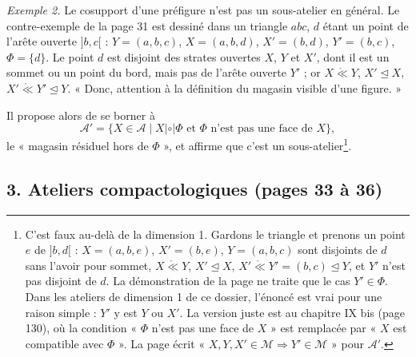\documentclass[11pt,a4paper]{article}
\begin{document}
\emph{Exemple 2.} Le cosupport d'une préfigure n'est pas un sous-atelier en
général. Le contre-exemple de la page 31 est dessiné dans un triangle $abc$,
$d$ étant un point de l'arête ouverte $]b,c[$ : $Y = (a,b,c)$, $X = (a,b,d)$,
$X' = (b,d)$, $Y' = (b,c)$, $\Phi = \{d\}$. Le point $d$ est disjoint des strates
ouvertes $X$, $Y$ et $X'$, dont il est un sommet ou un point du bord, mais pas
de l'arête ouverte $Y'$ ; or $X \mathrel{\mathring{\ll}} Y$, $X' \trianglelefteq
X$, $X' \mathrel{\mathring{\ll}} Y' \trianglelefteq Y$. « Donc, attention à la
définition du magasin visible d'une figure. »

Il propose alors de se borner à
\[
\mathcal{A}' = \{ X \in \mathcal{A} \mid X \mathrel{|\circ|} \Phi \text{ et }
\Phi \text{ n'est pas une face de } X \},
\]
le « magasin résiduel hors de $\Phi$ », et affirme que c'est un
sous-atelier\footnote{C'est faux au-delà de la dimension 1. Gardons le triangle
et prenons un point $e$ de $]b,d[$ : $X = (a,b,e)$, $X' = (b,e)$, $Y = (a,b,c)$
sont disjoints de $d$ sans l'avoir pour sommet, $X \mathrel{\mathring{\ll}} Y$,
$X' \trianglelefteq X$, $X' \mathrel{\mathring{\ll}} Y' = (b,c) \trianglelefteq
Y$, et $Y'$ n'est pas disjoint de $d$. La démonstration de la page ne traite que
le cas $Y' \in \Phi$. Dans les ateliers de dimension 1 de ce dossier,
l'énoncé est vrai pour une raison simple : $Y'$ y est $Y$ ou $X'$. La version
juste est au chapitre IX bis (page 130), où la condition « $\Phi$ n'est pas une
face de $X$ » est remplacée par « $X$ est compatible avec $\Phi$ ». La page écrit
« $X, Y, X' \in \mathcal{M} \Rightarrow Y' \in \mathcal{M}$ » pour
$\mathcal{A}'$.}.

\subsection*{3. Ateliers compactologiques (pages 33 à 36)}
\end{document}
